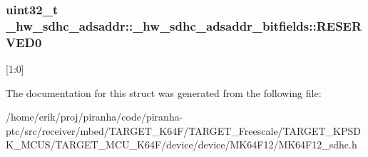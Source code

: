 \subsubsection[{\texorpdfstring{R\+E\+S\+E\+R\+V\+E\+D0}{RESERVED0}}]{\setlength{\rightskip}{0pt plus 5cm}uint32\+\_\+t \+\_\+hw\+\_\+sdhc\+\_\+adsaddr\+::\+\_\+hw\+\_\+sdhc\+\_\+adsaddr\+\_\+bitfields\+::\+R\+E\+S\+E\+R\+V\+E\+D0}\hypertarget{struct__hw__sdhc__adsaddr_1_1__hw__sdhc__adsaddr__bitfields_afa0e29578505a2d69714a5a6ed1f0ca1}{}\label{struct__hw__sdhc__adsaddr_1_1__hw__sdhc__adsaddr__bitfields_afa0e29578505a2d69714a5a6ed1f0ca1}
\mbox{[}1\+:0\mbox{]} 

The documentation for this struct was generated from the following file\+:\begin{DoxyCompactItemize}
\item 
/home/erik/proj/piranha/code/piranha-\/ptc/src/receiver/mbed/\+T\+A\+R\+G\+E\+T\+\_\+\+K64\+F/\+T\+A\+R\+G\+E\+T\+\_\+\+Freescale/\+T\+A\+R\+G\+E\+T\+\_\+\+K\+P\+S\+D\+K\+\_\+\+M\+C\+U\+S/\+T\+A\+R\+G\+E\+T\+\_\+\+M\+C\+U\+\_\+\+K64\+F/device/device/\+M\+K64\+F12/M\+K64\+F12\+\_\+sdhc.\+h\end{DoxyCompactItemize}
